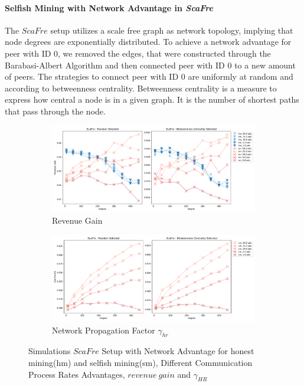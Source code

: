 \paragraph{Selfish Mining with Network Advantage in \textit{ScaFre}}
The $ScaFre$ setup utilizes a scale free graph as network topology, implying that node degrees are exponentially distributed. To achieve a network advantage for peer with ID $0$, we removed the edges, that were constructed through the Barabasi-Albert Algorithm and then connected peer with ID $0$ to a new amount of peers. The strategies to connect peer with ID $0$ are uniformly at random and according to betweenness centrality. Betweenness centrality is a measure to express how central a node is in a given graph. It is the number of shortest paths that pass through the node\cite{bcent}.
\begin{figure}[tbp]
	 \begin{subfigure}[b]{\textwidth}
		\includegraphics[width=\textwidth]{figures/sm_edge_revenue_barabasi.pdf}
		\caption{Revenue Gain}
		\label{fig:sm_edge_rev_bara}
	\end{subfigure}
	\begin{subfigure}[b]{\textwidth}
		\includegraphics[width=\textwidth]{figures/sm_edge_gamma_barabasi.pdf}
		\caption{Network Propagation Factor $\gamma_{hr}$}
		\label{fig:sm_edge_gamma_bara}
	\end{subfigure}
	
	\caption{Simulations $ScaFre$ Setup with Network Advantage for honest mining(hm) and selfish mining(sm), Different Communication Process Rates Advantages, $revenue~gain$ and $\gamma_{HR}$}
\end{figure}
